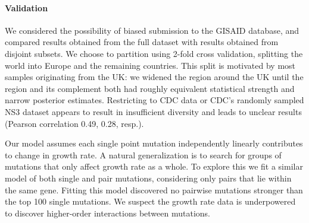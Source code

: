 \documentclass[12pt]{article}
\begin{document}
\paragraph*{Validation}

We considered the possibility of biased submission to the GISAID database, and compared results obtained from the full dataset with results obtained from disjoint subsets.
We choose to partition using 2-fold cross validation, splitting the world into Europe and the remaining countries.
This split is motivated by most samples originating from the UK: we widened the region around the UK until the region and its complement both had roughly equivalent statistical strength and narrow posterior estimates.
Restricting to CDC data or CDC's randomly sampled NS3 dataset appears to result in insufficient diversity and leads to unclear results (Pearson correlation 0.49, 0.28, resp.).

Our model assumes each single point mutation independently linearly contributes to change in growth rate.
A natural generalization is to search for groups of mutations that only affect growth rate as a whole.
To explore this we fit a similar model of both single and pair mutations, considering only pairs that lie within the same gene.
Fitting this model discovered no pairwise mutations stronger than the top 100 single mutations.
We suspect the growth rate data is underpowered to discover higher-order interactions between mutations.




\end{document}
